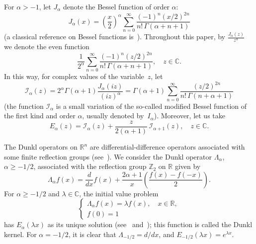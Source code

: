 \documentclass[a4paper]{amsart}
\numberwithin{equation}{section}
\theoremstyle{plain}
\theoremstyle{remark}
\newcommand{\R}{\mathbb{R}}
\newcommand{\Z}{\mathbb{Z}}
\newcommand{\C}{\mathbb{C}}
\begin{document}
For $\alpha>-1$, let $J_{\alpha}$ denote the Bessel function of order
$\alpha$:
\[
   J_{\alpha}(x)
   = \left( \frac{x}{2} \right)^{\alpha}
   \sum_{n=0}^{\infty} \frac{(-1)^n (x/2)^{2n}}{n! \, \Gamma(\alpha+n+1)}
\]
(a classical reference on Bessel functions is~\cite{Wat}). 
Throughout this paper, by $\frac{J_{\alpha}(z)}{z^\alpha}$ we denote the even 
function
\begin{equation*}
   \frac{1}{2^\alpha}
   \sum_{n=0}^{\infty} \frac{(-1)^n (z/2)^{2n}}{n! \, \Gamma(\alpha+n+1)},
   \quad z \in \C.
\end{equation*}
In this way, for complex values of the variable~$z$, let
\[
   \mathcal{I}_{\alpha}(z)
   = 2^{\alpha} \Gamma(\alpha+1) \frac{J_{\alpha}(iz)}{(iz)^{\alpha}}
   = \Gamma(\alpha+1) \sum_{n=0}^{\infty}
   \frac{(z/2)^{2n}}{n!\,\Gamma(n+\alpha+1)}
\]
(the function $\mathcal{I}_{\alpha}$ is a small variation of the so-called 
modified Bessel function of the first kind and order $\alpha$, usually denoted 
by~$I_{\alpha}$). Moreover, let us take
\[
   E_{\alpha}(z)
   = \mathcal{I}_{\alpha}(z) + \frac{z}{2(\alpha+1)}\, \mathcal{I}_{\alpha+1}(z),
   \quad z \in \C.
\]


The Dunkl operators on $\R^n$ are differential-difference operators
associated with some finite reflection groups (see~\cite{Du}). We
consider the Dunkl operator $\Lambda_\alpha$, $\alpha \ge -1/2$, associated
with the reflection group $\Z_2$ on $\R$ given by
\begin{equation}
\label{eq:dunkloper}
  \Lambda_\alpha f(x) = \frac{d}{dx}f(x) + \frac{2\alpha+1}{x}
  \left(\frac{f(x)-f(-x)}{2}\right).
\end{equation}
For $\alpha \ge -1/2$ and $\lambda\in \C$, the initial value problem
\begin{equation}
\label{eq:dunklproblem}
\begin{cases}
  \Lambda_\alpha f(x) = \lambda f(x),\quad x\in \R, \\
  f(0) = 1
\end{cases}
\end{equation}
has $E_\alpha(\lambda x)$ as its unique solution (see~\cite{Du2} and~\cite{Jeu}); 
this function is called the Dunkl kernel. 
For $\alpha = -1/2$, it is clear that $\Lambda_{-1/2} = d/dx$, and $E_{-1/2}(\lambda x) = e^{\lambda x}$.
\end{document}

